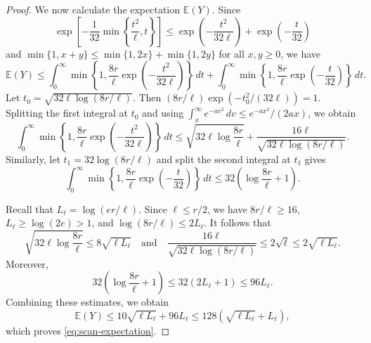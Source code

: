 \documentclass[10pt,a4paper]{amsart}
\numberwithin{equation}{section}
\begin{document}
\begin{proof}
We now calculate the expectation $\mathbb{E}(Y)$.  Since
$$
 \exp\left[-\frac1{32}\min\left\{\frac{t^2}{\ell},t\right\}\right]
 \le \exp\left(-\frac{t^2}{32\ell}\right)+\exp\left(-\frac t{32}\right)
$$
and $\min\{1,x+y\}\le\min\{1,2x\}+\min\{1,2y\}$ for all $x,y\ge0$, we have
$$ \mathbb{E}(Y)
 \le\int_0^\infty\min\left\{1,\frac{8r}{\ell}
       \exp\left(-\frac{t^2}{32\ell}\right)\right\}\,dt
   +\int_0^\infty\min\left\{1,\frac{8r}{\ell}
       \exp\left(-\frac t{32}\right)\right\}\,dt.$$
Let
$t_0=\sqrt{32\ell\log(8r/\ell)}$.
Then $(8r/\ell)\exp(-t_0^2/(32\ell))=1$.  Splitting the first integral at $t_0$ and using
$\int_x^\infty e^{-av^2}\,dv\le e^{-ax^2}/(2ax)$, we obtain
$$
 \int_0^\infty\min\left\{1,\frac{8r}{\ell}
       \exp\left(-\frac{t^2}{32\ell}\right)\right\}\,dt
 \le \sqrt{32\ell\log\frac{8r}{\ell}}
    +\frac{16\ell}{\sqrt{32\ell\log(8r/\ell)}}.
$$
Similarly, let $t_1=32\log(8r/\ell)$ and split the second integral at $t_1$ gives
$$
 \int_0^\infty\min\left\{1,\frac{8r}{\ell}
       \exp\left(-\frac t{32}\right)\right\}\,dt
 \le32\left(\log\frac{8r}{\ell}+1\right).
$$

Recall that $L_\ell=\log(er/\ell)$.  Since $\ell\le r/2$, we have
$8r/\ell\ge16$, $L_\ell\ge\log(2e)>1$, and
$\log(8r/\ell)\le2L_\ell$.  
It follows that
$$
 \sqrt{32\ell\log\frac{8r}{\ell}}
 \le8\sqrt{\ell L_\ell}
\quad \text{and} \quad
 \frac{16\ell}{\sqrt{32\ell\log(8r/\ell)}}
 \le2\sqrt{\ell}
 \le2\sqrt{\ell L_\ell}.
$$
Moreover,
$$
 32\left(\log\frac{8r}{\ell}+1\right)
 \le32(2L_\ell+1)
 \le96L_\ell.
$$
Combining these estimates, we obtain
$$ \mathbb{E}(Y)
 \le10\sqrt{\ell L_\ell}+96L_\ell
 \le128\left(\sqrt{\ell L_\ell}+L_\ell\right),$$
which proves \eqref{eq:scan-expectation}.
\end{proof}
\end{document}
